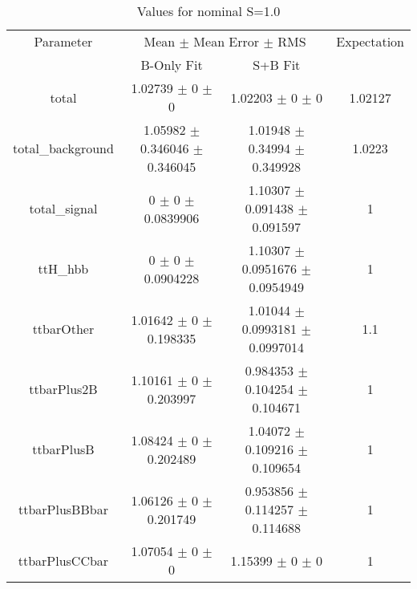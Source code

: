 \begin{table}
\centering
\caption{Values for nominal S=1.0}
\begin{tabular}{cccc}
\toprule
Parameter & \multicolumn{2}{c}{Mean $\pm$ Mean Error $\pm$ RMS} & Expectation\\
 & B-Only Fit & S+B Fit & \\
\midrule
total & \num{1.02739} $\pm$ \num{0} $\pm$ \num{0} & \num{1.02203} $\pm$ \num{0} $\pm$ \num{0} & \num{1.02127}\\
total\_background & \num{1.05982} $\pm$ \num{0.346046} $\pm$ \num{0.346045} & \num{1.01948} $\pm$ \num{0.34994} $\pm$ \num{0.349928} & \num{1.0223}\\
total\_signal & \num{0} $\pm$ \num{0} $\pm$ \num{0.0839906} & \num{1.10307} $\pm$ \num{0.091438} $\pm$ \num{0.091597} & \num{1}\\
ttH\_hbb & \num{0} $\pm$ \num{0} $\pm$ \num{0.0904228} & \num{1.10307} $\pm$ \num{0.0951676} $\pm$ \num{0.0954949} & \num{1}\\
ttbarOther & \num{1.01642} $\pm$ \num{0} $\pm$ \num{0.198335} & \num{1.01044} $\pm$ \num{0.0993181} $\pm$ \num{0.0997014} & \num{1.1}\\
ttbarPlus2B & \num{1.10161} $\pm$ \num{0} $\pm$ \num{0.203997} & \num{0.984353} $\pm$ \num{0.104254} $\pm$ \num{0.104671} & \num{1}\\
ttbarPlusB & \num{1.08424} $\pm$ \num{0} $\pm$ \num{0.202489} & \num{1.04072} $\pm$ \num{0.109216} $\pm$ \num{0.109654} & \num{1}\\
ttbarPlusBBbar & \num{1.06126} $\pm$ \num{0} $\pm$ \num{0.201749} & \num{0.953856} $\pm$ \num{0.114257} $\pm$ \num{0.114688} & \num{1}\\
ttbarPlusCCbar & \num{1.07054} $\pm$ \num{0} $\pm$ \num{0} & \num{1.15399} $\pm$ \num{0} $\pm$ \num{0} & \num{1}\\
\bottomrule
\end{tabular}
\end{table}